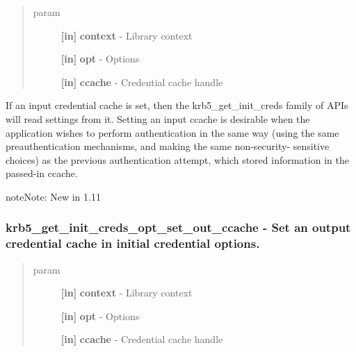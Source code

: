 \documentclass[letterpaper,10pt,english]{sphinxmanual}
\begin{document}
\begin{quote}\begin{description}
\item[{param}] \leavevmode
\textbf{{[}in{]}} \textbf{context} - Library context

\textbf{{[}in{]}} \textbf{opt} - Options

\textbf{{[}in{]}} \textbf{ccache} - Credential cache handle

\end{description}\end{quote}

If an input credential cache is set, then the krb5\_get\_init\_creds family of APIs will read settings from it. Setting an input ccache is desirable when the application wishes to perform authentication in the same way (using the same preauthentication mechanisms, and making the same non-security- sensitive choices) as the previous authentication attempt, which stored information in the passed-in ccache.

\begin{notice}{note}{Note:}
New in 1.11
\end{notice}


\subsubsection{krb5\_get\_init\_creds\_opt\_set\_out\_ccache -  Set an output credential cache in initial credential options.}
\label{appdev/refs/api/krb5_get_init_creds_opt_set_out_ccache:krb5-get-init-creds-opt-set-out-ccache-set-an-output-credential-cache-in-initial-credential-options}\label{appdev/refs/api/krb5_get_init_creds_opt_set_out_ccache::doc}

\begin{fulllineitems}
\label{appdev/refs/api/krb5_get_init_creds_opt_set_out_ccache:krb5_get_init_creds_opt_set_out_ccache}
\end{fulllineitems}

\begin{quote}\begin{description}
\item[{param}] \leavevmode
\textbf{{[}in{]}} \textbf{context} - Library context

\textbf{{[}in{]}} \textbf{opt} - Options

\textbf{{[}in{]}} \textbf{ccache} - Credential cache handle

\end{description}\end{quote}
\end{document}
